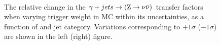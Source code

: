 \begin{figure}[!h]
  \centering
   ~~
  \\

  \caption{\label{fig:tfSyst_trigger_gjToZinv} The relative change in
  the $\gamma + jets \rightarrow ({\text Z} \rightarrow \nu\bar{\nu})$ transfer
  factors when varying trigger weight in MC within its uncertainties, as a function of \scalht and jet category. 
  Variations corresponding to $+1\sigma$ ($-1\sigma$) are shown in the left (right) figure. 
  }
\end{figure}


